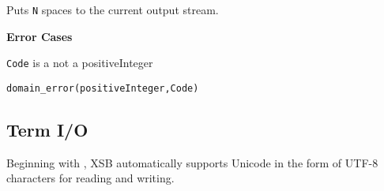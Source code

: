 \begin{description}
    Puts {\tt N} spaces to the current output stream. 

{\bf Error Cases}
\bi
\item 	{\tt Code} is a not a positiveInteger
\bi
\item 	{\tt domain\_error(positiveInteger,Code)}
\ei
\ei

%
\end{description}

\subsection{Term I/O}
Beginning with \version{}, XSB automatically supports Unicode in the
form of UTF-8 characters for reading and writing.

